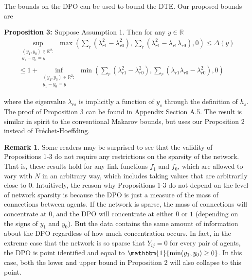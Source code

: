 \documentclass[12pt]{article}
\theoremstyle{definition}
\newtheorem{remark}{Remark}
\begin{document}
The bounds on the DPO can be used to bound the DTE. Our proposed bounds are
\begin{flushleft}
\textbf{Proposition 3:} Suppose Assumption 1. Then for any $y \in \mathbb{R}$
\begin{align}\label{SM}
\sup_{\substack{(y_{1},y_{0}) \in \mathbb{R}^{2}:\\ y_{1}-y_{0} = y}}\max\left(\sum_{r}\left(\lambda_{r1}^{2} - \lambda_{r0}^{2}\right),\sum_{r}\left(\lambda_{r1}^{2}-\lambda_{r1}\lambda_{r0}\right),0\right)
\leq \Delta(y) \nonumber \\
\leq 1 + \inf_{\substack{(y_{1},y_{0}) \in \mathbb{R}^{2}:\\ y_{1}-y_{0} = y}}\min\left(\sum_{r}\left(\lambda_{r1}^{2} - \lambda_{r0}^{2}\right),\sum_{r}\left(\lambda_{r1}\lambda_{r0}- \lambda_{r0}^{2}\right),0\right)
\end{align}
\end{flushleft}
where the eigenvalue $\lambda_{rs}$ is implicitly a function of $y_{s}$ through the definition of $h_{s}$. The proof of Proposition 3 can be found in Appendix Section A.5. The result is similar in spirit to the conventional Makarov bounds, but uses our Proposition 2 instead of Fr\'echet-Hoeffding. %

\begin{remark}
Some readers may be surprised to see that the validity of Propositions 1-3 do not require any restrictions on the sparsity of the network. That is, these results hold for any link functions $f_1$ and $f_0$, which are allowed to vary with $N$ in an arbitrary way, which includes taking values that are arbitrarily close to $0$. Intuitively, the reason why Propositions 1-3 do not depend on the level of network sparsity is because the DPO is just a measure of the mass of connections between agents. If the network is sparse, the mass of connections will concentrate at $0$, and the DPO will concentrate at either $0$ or $1$ (depending on the signs of $y_1$ and $y_0$). But the data contains the same amount of information about the DPO regardless of how much concentration occurs. In fact, in the extreme case that the network is so sparse that $Y_{ij} = 0$ for every pair of agents, the DPO is point identified and equal to $\mathbbm{1}\{\min(y_1,y_0) \geq 0\}$. In this case, both the lower and upper bound in Proposition 2 will also collapse to this point.  
\end{remark}
\end{document}
